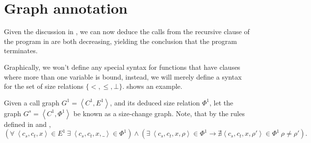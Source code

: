 \section{Graph annotation}

Given the discussion in , we can now
deduce the calls from the recursive clause of the program in
 are both decreasing, yielding the conclusion that
the program  terminates.

Graphically, we won't define any special syntax for functions that have clauses
where more than one variable is bound, instead, we will merely define a syntax
for the set of size relations $\{<,\leq,\bot\}$. 
shows an example.

\begin{definition} Given a call graph $G^1 = \left\langle C^1, E^1
\right\rangle$, and its deduced size relation $\Phi^1$, let the graph $G^s =
\left\langle C^1, \Phi^1 \right\rangle$ be known as a size-change graph. Note,
that by the rules defined in  and
, $$\left(\forall\ \left\langle c_s, c_t, x
\right\rangle \in E^1\ \exists\ \left\langle c_s, c_t, x, \_ \right\rangle \in
\Phi^1\right) \wedge \left(\exists\ \left\langle c_s, c_t, x, \rho
\right\rangle \in \Phi^1\longrightarrow \nexists \left\langle c_s, c_t, x,
\rho' \right\rangle \in \Phi^1\ \rho\neq\rho' \right).$$\end{definition}

